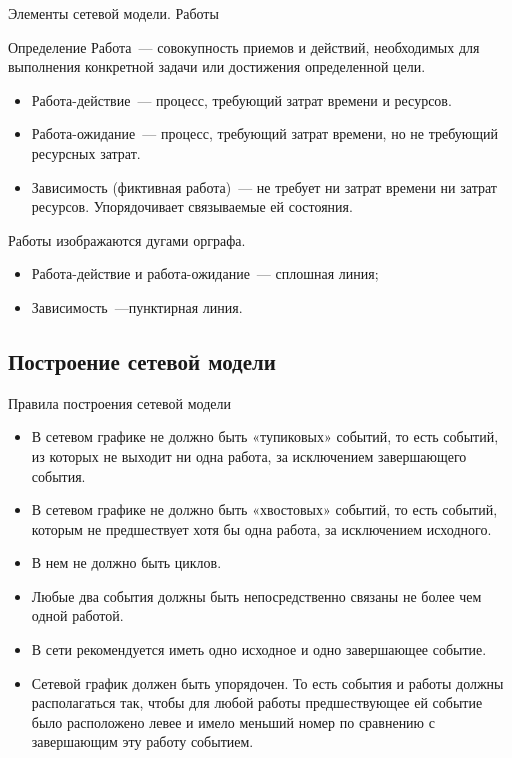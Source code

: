 \documentclass[unicode,11pt,notheorems]{beamer}
\begin{document}
\begin{frame}{Элементы сетевой модели. Работы}

\begin{block}{Определение}
	\alert{Работа}~--- совокупность приемов и действий, необходимых для выполнения конкретной задачи или достижения определенной цели. 
\end{block}
	\begin{itemize}
	\item 
		\alert{Работа-действие}~--- процесс, требующий затрат времени и ресурсов. 

	\item 
		\alert{Работа-ожидание}~--- процесс, требующий затрат времени, но не требующий ресурсных затрат. 

	\item 
		\alert{Зависимость (фиктивная работа)}~---  не требует ни затрат времени ни затрат ресурсов.
		Упорядочивает связываемые ей состояния. 
		

	\end{itemize}

	\medskip
	
	\alert{Работы} изображаются дугами орграфа.
	\begin{itemize}
	\item 
		Работа-действие и работа-ожидание~--- сплошная линия;
	\item 
		Зависимость~---пунктирная линия.
	\end{itemize}

\end{frame}

\subsection{Построение сетевой модели}
\begin{frame}{Правила построения  сетевой модели}
	\begin{itemize}
	\item
		В сетевом графике не должно быть «тупиковых» событий, то есть событий, из которых не выходит ни одна работа, за исключением завершающего события.
	\item
		В сетевом графике не должно быть «хвостовых» событий, то есть событий, которым не предшествует хотя бы одна работа, за исключением исходного.
	\item
		В нем не должно быть циклов.
	\item
		Любые два события должны быть непосредственно связаны не более чем одной работой.
	\item
		В сети рекомендуется иметь одно исходное и одно завершающее событие.
	\item
		Сетевой график должен быть упорядочен. То есть события и работы должны располагаться так, чтобы для любой работы предшествующее ей событие было расположено левее и имело меньший номер по сравнению с завершающим эту работу событием.		
	\end{itemize}
\end{frame}
\end{document}
